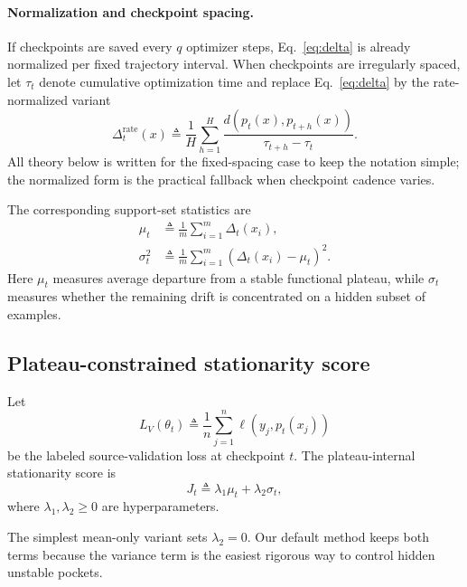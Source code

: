 \documentclass{article}
\begin{document}
\paragraph{Normalization and checkpoint spacing.}
If checkpoints are saved every $q$ optimizer steps, Eq.~\eqref{eq:delta} is already normalized per fixed trajectory interval. When checkpoints are irregularly spaced, let $\tau_t$ denote cumulative optimization time and replace Eq.~\eqref{eq:delta} by the rate-normalized variant
\begin{equation}
    \Delta_t^{\mathrm{rate}}(x)
    \triangleq
    \frac{1}{H}\sum_{h=1}^{H}
    \frac{
        d\!\left(p_t(x), p_{t+h}(x)\right)
    }{
        \tau_{t+h}-\tau_t
    }.
    \label{eq:delta_rate}
\end{equation}
All theory below is written for the fixed-spacing case to keep the notation simple; the normalized form is the practical fallback when checkpoint cadence varies.

The corresponding support-set statistics are
\begin{align}
    \mu_t &\triangleq \frac{1}{m}\sum_{i=1}^{m}\Delta_t(x_i), \label{eq:mu}\\
    \sigma_t^2 &\triangleq \frac{1}{m}\sum_{i=1}^{m}\left(\Delta_t(x_i)-\mu_t\right)^2. \label{eq:sigma}
\end{align}
Here $\mu_t$ measures average departure from a stable functional plateau, while $\sigma_t$ measures whether the remaining drift is concentrated on a hidden subset of examples.

\subsection{Plateau-constrained stationarity score}

Let
\begin{equation}
    L_V(\theta_t)
    \triangleq
    \frac{1}{n}\sum_{j=1}^{n}\ell\!\left(y_j, p_t(x_j)\right)
\end{equation}
be the labeled source-validation loss at checkpoint $t$. The plateau-internal stationarity score is
\begin{equation}
    J_t
    \triangleq
    \lambda_1 \mu_t
    + \lambda_2 \sigma_t,
    \label{eq:stationarity_score}
\end{equation}
where $\lambda_1,\lambda_2 \ge 0$ are hyperparameters.

The simplest mean-only variant sets $\lambda_2=0$. Our default method keeps both terms because the variance term is the easiest rigorous way to control hidden unstable pockets.
\end{document}
